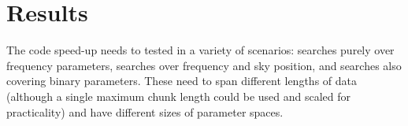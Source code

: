 \section{Results}

The code speed-up needs to tested in a variety of scenarios: searches purely over frequency parameters, searches over frequency and sky position, and searches also covering binary parameters. These need to span different lengths of data (although a single maximum chunk length could be used and scaled for practicality) and have different sizes of parameter spaces.